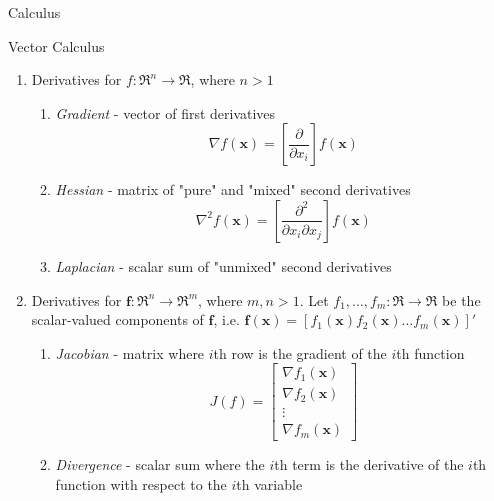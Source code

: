 \documentclass{article}
\begin{document}
\begin{section}{Calculus}
\begin{subsection}{Vector Calculus}
\begin{enumerate}
\item Derivatives for $f : \Re^n \to \Re$, where $n > 1$
    \begin{enumerate}
    \item \emph{Gradient} - vector of first derivatives
    \[ \nabla f(\mathbf{x}) = \left[ \frac{\partial}{\partial x_i} \right] 
           f(\mathbf{x}) \]
    \item \emph{Hessian} - matrix of "pure" and "mixed" second derivatives
          \[ \nabla^2 f(\mathbf{x}) = 
            \left[\frac{\partial^2}{\partial x_{i} \partial x_{j}}\right] 
            f(\mathbf{x}) \]
    \item \emph{Laplacian} - scalar sum of "unmixed" second derivatives
    \end{enumerate}
\item Derivatives for $\mathbf{f} : \Re^n \to \Re^m$, where $m, n > 1$. Let 
      $f_1, \ldots, f_m : \Re \to \Re$ be the scalar-valued components of 
      $\mathbf{f}$, i.e.
      $\mathbf{f}(\mathbf{x}) = [f_1(\mathbf{x}) f_2(\mathbf{x}) \ldots
        f_m(\mathbf{x})]'$
    \begin{enumerate}
    \item \emph{Jacobian} - matrix where $i$th row is the gradient of the 
          $i$th function
          \[ J(f) = \begin{bmatrix}
                    \nabla f_1(\mathbf{x}) \\
                    \nabla f_2(\mathbf{x}) \\
                    \vdots \\
                    \nabla f_m(\mathbf{x})
                    \end{bmatrix} \]
    \item \emph{Divergence} - scalar sum where the $i$th term is the 
          derivative of the $i$th function with respect to the $i$th variable
    \end{enumerate}
\end{enumerate}
\end{subsection}
\end{section}
\end{document}
